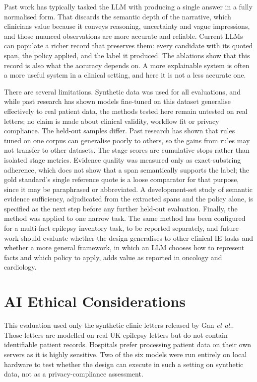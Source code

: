 \documentclass[conference]{IEEEtran}
\begin{document}
Past work has typically tasked the LLM with producing a single 
answer in a fully normalised form\cite{b3}. That discards the 
semantic depth of the narrative, which clinicians value because 
it conveys reasoning, uncertainty and vague impressions, and 
those nuanced observations are more accurate and 
reliable\cite{b18}. Current LLMs can populate a richer record 
that preserves them: every candidate with its quoted span, the 
policy applied, and the label it produced. The ablations show 
that this record is also what the accuracy depends on. A more 
explainable system is often a more useful system in a clinical 
setting\cite{b14}, and here it is not a less accurate one.

There are several limitations. Synthetic data was used for 
all evaluations, and while past research has shown models 
fine-tuned on this dataset generalise effectively to real 
patient data\cite{b3}, the methods tested here remain untested 
on real letters; no claim is made about clinical validity, 
workflow fit or privacy compliance. The held-out samples 
differ. Past research has shown that rules tuned on one corpus 
can generalise poorly to others, so the gains from rules may 
not transfer to other datasets\cite{b6}. The stage scores are 
cumulative stops rather than isolated stage metrics. Evidence 
quality was measured only as exact-substring adherence, which 
does not show that a span semantically supports the label; the 
gold standard's single reference quote is a loose comparator 
for that purpose, since it may be paraphrased or abbreviated. A 
development-set study of semantic evidence sufficiency, 
adjudicated from the extracted spans and the policy alone, is 
specified as the next step before any further held-out 
evaluation. Finally, the method was applied to one narrow task. 
The same method has been configured for a multi-fact 
epilepsy inventory task\cite{b4}, to be reported separately, 
and future work should evaluate whether the design generalises 
to other clinical IE tasks and whether a more general 
framework, in which an LLM chooses how to represent facts and 
which policy to apply, adds value as reported in 
oncology\cite{b19} and cardiology\cite{b20}.

\section{AI Ethical Considerations}

This evaluation used only the synthetic clinic letters released
by Gan \emph{et al.}\cite{b3}. Those letters are modelled on real
UK epilepsy letters but do not contain identifiable patient records. 
Hospitals prefer processing patient data on their own servers as
it is highly sensitive\cite{b5}. Two of the six models were 
run entirely on local hardware to test whether the design can 
execute in such a setting on synthetic data, not as a 
privacy-compliance assessment.
\end{document}
